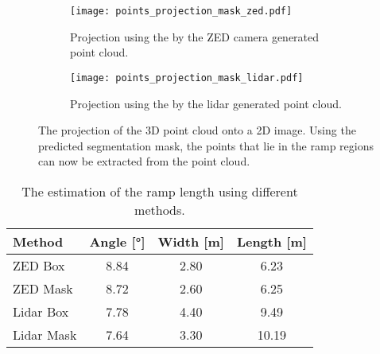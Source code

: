 \begin{figure}[htb]
	\centering
	\begin{subfigure}{1\textwidth}
		\centering
		\texttt{[image: points\_projection\_mask\_zed.pdf]}
		\caption{Projection using the by the ZED camera generated point cloud.}
		\label{fig:points_projection_mask_zed}
	\end{subfigure}
	
	\begin{subfigure}{1\textwidth}
		\centering
		\texttt{[image: points\_projection\_mask\_lidar.pdf]}
		\caption{Projection using the by the \acrshort{lidar} generated point cloud.}
		\label{fig:points_projection_mask_lidar}
	\end{subfigure}
	\caption{The projection of the 3D point cloud onto a 2D image. Using the predicted segmentation mask, the points that lie in the ramp regions can now be extracted from the point cloud.}
\end{figure}

\begin{table}[htb]
	\centering
	\caption[Ramp length]{The estimation of the ramp length using different methods.}
	\label{tab:cloud_extraction_estimation}
	\begin{tabular}[t]{lccc}
		\toprule
		\textbf{Method} & \textbf{Angle} [\si{\degree}] & \textbf{Width} [\si{\metre}] & \textbf{Length} [\si{\metre}] \\
		\midrule
		ZED Box         & \SI{8.84}{}                   & \SI{2.80}{}                  & \SI{6.23}[]{}                 \\
		ZED Mask        & \SI{8.72}{}                   & \SI{2.60}{}                  & \SI{6.25}[]{}                 \\
		Lidar Box       & \SI{7.78}{}                   & \SI{4.40}{}                  & \SI{9.49}[]{}                 \\
		Lidar Mask      & \SI{7.64}{}                   & \SI{3.30}{}                  & \SI{10.19}[]{}                \\
		\bottomrule
	\end{tabular}
\end{table}